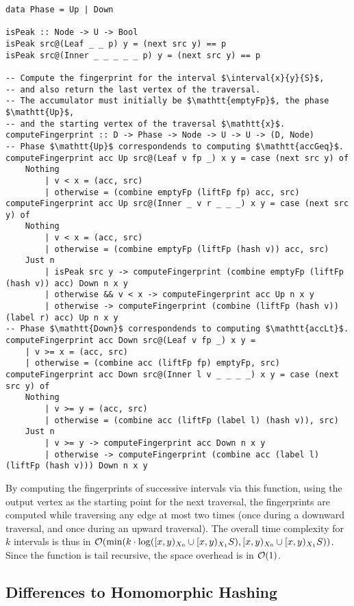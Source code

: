 \begin{verbatim}
data Phase = Up | Down

isPeak :: Node -> U -> Bool
isPeak src@(Leaf _ _ p) y = (next src y) == p
isPeak src@(Inner _ _ _ _ _ p) y = (next src y) == p

-- Compute the fingerprint for the interval $\interval{x}{y}{S}$,
-- and also return the last vertex of the traversal.
-- The accumulator must initially be $\mathtt{emptyFp}$, the phase $\mathtt{Up}$,
-- and the starting vertex of the traversal $\mathtt{x}$.
computeFingerprint :: D -> Phase -> Node -> U -> U -> (D, Node)
-- Phase $\mathtt{Up}$ correspondends to computing $\mathtt{accGeq}$.
computeFingerprint acc Up src@(Leaf v fp _) x y = case (next src y) of
    Nothing
        | v < x = (acc, src)
        | otherwise = (combine emptyFp (liftFp fp) acc, src)
computeFingerprint acc Up src@(Inner _ v r _ _ _) x y = case (next src y) of
    Nothing
        | v < x = (acc, src)
        | otherwise = (combine emptyFp (liftFp (hash v)) acc, src)
    Just n
        | isPeak src y -> computeFingerprint (combine emptyFp (liftFp (hash v)) acc) Down n x y
        | otherwise && v < x -> computeFingerprint acc Up n x y
        | otherwise -> computeFingerprint (combine (liftFp (hash v)) (label r) acc) Up n x y
-- Phase $\mathtt{Down}$ correspondends to computing $\mathtt{accLt}$.
computeFingerprint acc Down src@(Leaf v fp _) x y =
    | v >= x = (acc, src)
    | otherwise = (combine acc (liftFp fp) emptyFp, src)
computeFingerprint acc Down src@(Inner l v _ _ _ _) x y = case (next src y) of
    Nothing
        | v >= y = (acc, src)
        | otherwise = (combine acc (liftFp (label l) (hash v)), src)
    Just n
        | v >= y -> computeFingerprint acc Down n x y
        | otherwise -> computeFingerprint (combine acc (label l) (liftFp (hash v))) Down n x y
\end{verbatim}

By computing the fingerprints of successive intervals via this function, using the output vertex as the starting point for the next traversal, the fingerprints are computed while traversing any edge at most two times (once during a downward traversal, and once during an upward traversal). The overall time complexity for $k$ intervals is thus in $\mathcal{O}(\min(k \cdot \log([{x},{y})_{X_0} \cup [{x},{y})_{X_1}{S}), [{x},{y})_{X_0} \cup [{x},{y})_{X_1}{S}))$. Since the function is tail recursive, the space overhead is in $\mathcal{O}(1)$.

\subsection{Differences to Homomorphic Hashing}


